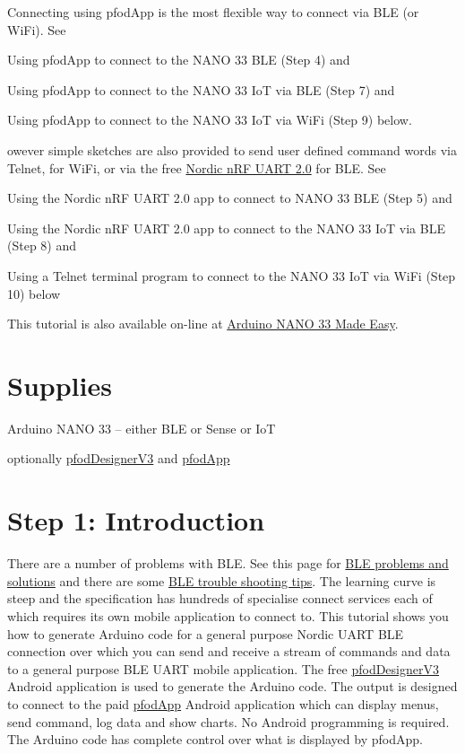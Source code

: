 Connecting using pfodApp is the most flexible way to connect via BLE (or WiFi). See

Using pfodApp to connect to the NANO 33 BLE (Step 4) and

Using pfodApp to connect to the NANO 33 IoT via BLE (Step 7) and

Using pfodApp to connect to the NANO 33 IoT via WiFi (Step 9) below.
    
owever simple sketches are also provided to send user defined command words via Telnet, for WiFi, or via the free \href{https://play.google.com/store/apps/details?id=com.nordicsemi.nrfUARTv2&hl=en&pli=1}{Nordic nRF UART 2.0} for BLE. See

Using the Nordic nRF UART 2.0 app to connect to NANO 33 BLE (Step 5) and

Using the Nordic nRF UART 2.0 app to connect to the NANO 33 IoT via BLE (Step 8) and

Using a Telnet terminal program to connect to the NANO 33 IoT via WiFi (Step 10) below
    
This tutorial is also available on-line at \href{https://www.forward.com.au/pfod/BLE/Nano33/index.html}{Arduino NANO 33 Made Easy}.


\section{Supplies}

Arduino NANO 33 -- either BLE or Sense or IoT

optionally \href{https://www.forward.com.au/pfod/pfodDesigner/index.html}{pfodDesignerV3} and \href{https://www.forward.com.au/pfod/index.html}{pfodApp}

\section{Step 1: Introduction}

 There are a number of problems with BLE. See this page for \href{https://www.forward.com.au/pfod/BLE/BLEProblems/index.html}{BLE problems and solutions} and there are some \href{https://www.forward.com.au/pfod/BLE/index.html#TroubleShooting}{BLE trouble shooting tips}. The learning curve is steep and the specification has hundreds of specialise connect services each of which requires its own mobile application to connect to. This tutorial shows you how to generate Arduino code for a general purpose Nordic UART BLE connection over which you can send and receive a stream of commands and data to a general purpose BLE UART mobile application. The free \href{https://www.forward.com.au/pfod/pfodDesigner/index.html}{pfodDesignerV3} Android application is used to generate the Arduino code. The output is designed to connect to the paid \href{https://www.forward.com.au/pfod/index.html}{pfodApp} Android application which can display menus, send command, log data and show charts. No Android programming is required. The Arduino code has complete control over what is displayed by pfodApp.
    
